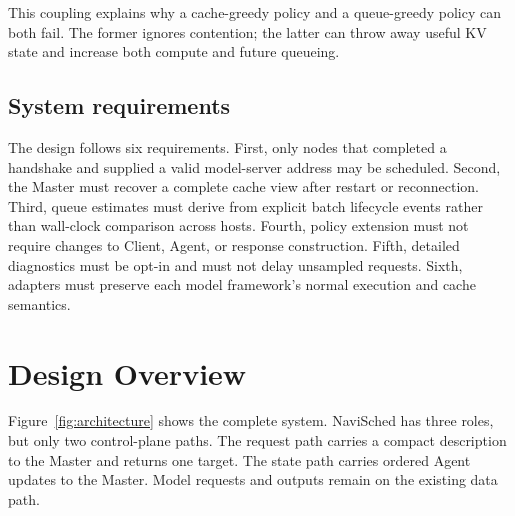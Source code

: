 \documentclass[10pt]{article}
\newcommand{\system}{NaviSched\xspace}
\begin{document}
This coupling explains why a cache-greedy policy and a queue-greedy policy can
both fail. The former ignores contention; the latter can throw away useful KV
state and increase both compute and future queueing.

\subsection{System requirements}

The design follows six requirements. First, only nodes that completed a
handshake and supplied a valid model-server address may be scheduled. Second,
the Master must recover a complete cache view after restart or reconnection.
Third, queue estimates must derive from explicit batch lifecycle events rather
than wall-clock comparison across hosts. Fourth, policy extension must not
require changes to Client, Agent, or response construction. Fifth, detailed
diagnostics must be opt-in and must not delay unsampled requests. Sixth, adapters
must preserve each model framework's normal execution and cache semantics.

\section{Design Overview}
\label{sec:overview}

Figure~\ref{fig:architecture} shows the complete system. \system has three
roles, but only two control-plane paths. The request path carries a compact
description to the Master and returns one target. The state path carries
ordered Agent updates to the Master. Model requests and outputs remain on the
existing data path.
\end{document}
